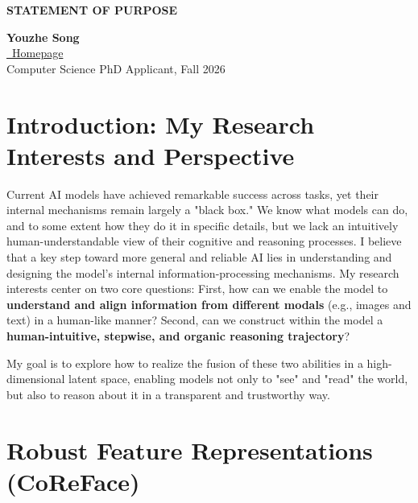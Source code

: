 \documentclass[11pt, letterpaper]{article}
\let\oldtextbf\textbf
\renewcommand{\textbf}[1]{{\color{black}\oldtextbf{#1}}}
\begin{document}
\noindent %
\begin{minipage}[t]{0.6\textwidth} %
    \raggedright
    \textbf{STATEMENT OF PURPOSE} \\
\end{minipage}%
\begin{minipage}[t]{0.5\textwidth} %
    \raggedleft
    \textbf{Youzhe Song} \\ %
    \href{https://isidoresong.github.io/}{\small\faHome\ Homepage} \\
    Computer Science PhD Applicant, Fall 2026 %
\end{minipage}

\vspace{2.5em} %

\section{Introduction: My Research Interests and Perspective}

Current AI models have achieved remarkable success across tasks, yet their internal mechanisms remain largely a "black box." We know what models can do, and to some extent how they do it in specific details, but we lack an intuitively human-understandable view of their cognitive and reasoning processes. I believe that a key step toward more general and reliable AI lies in understanding and designing the model's internal information-processing mechanisms. My research interests center on two core questions: First, how can we enable the model to \textbf{understand and align information from different modals} (e.g., images and text) in a human-like manner? Second, can we construct within the model a \textbf{human-intuitive, stepwise, and organic reasoning trajectory}?

My goal is to explore how to realize the fusion of these two abilities in a high-dimensional latent space, enabling models not only to "see" and "read" the world, but also to reason about it in a transparent and trustworthy way.

\section{Robust Feature Representations (CoReFace) \cite{coreface}}
\end{document}
